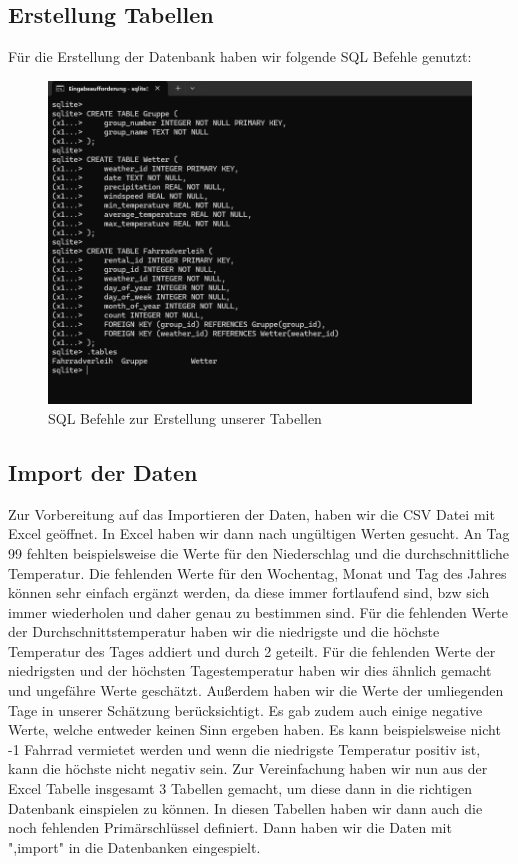 \documentclass[a4paper,11pt]{article}
\begin{document}
 
\subsection{Erstellung Tabellen}
Für die Erstellung der Datenbank haben wir folgende SQL Befehle genutzt: 


\begin{figure}[h]
\centering
\includegraphics[scale=.5]{Tabellen erstellen.png}
\caption{SQL Befehle zur Erstellung unserer Tabellen}
\label{fig:meine-grafik2}
\end{figure}

\subsection{Import der Daten}
Zur Vorbereitung auf das Importieren der Daten, haben wir die CSV Datei mit Excel geöffnet. In Excel haben wir dann nach ungültigen Werten gesucht. An Tag 99 fehlten beispielsweise die Werte für den Niederschlag und die durchschnittliche Temperatur. Die fehlenden Werte für den Wochentag, Monat und Tag des Jahres können sehr einfach ergänzt werden, da diese immer fortlaufend sind, bzw sich immer wiederholen und daher genau zu bestimmen sind. Für die fehlenden Werte der Durchschnittstemperatur haben wir die niedrigste und die höchste Temperatur des Tages addiert und durch 2 geteilt. Für die fehlenden Werte der niedrigsten und der höchsten Tagestemperatur haben wir dies ähnlich gemacht und ungefähre Werte geschätzt. Außerdem haben wir die Werte der umliegenden Tage in unserer Schätzung berücksichtigt. Es gab zudem auch einige negative Werte, welche entweder keinen Sinn ergeben haben. Es kann beispielsweise nicht -1 Fahrrad vermietet werden und wenn die niedrigste Temperatur positiv ist, kann die höchste nicht negativ sein.
Zur Vereinfachung haben wir nun aus der Excel Tabelle insgesamt 3 Tabellen gemacht, um diese dann in die richtigen Datenbank einspielen zu können. In diesen Tabellen haben wir dann auch die noch fehlenden Primärschlüssel definiert. 
Dann haben wir die Daten mit ",import" in die Datenbanken eingespielt. 
\end{document}
